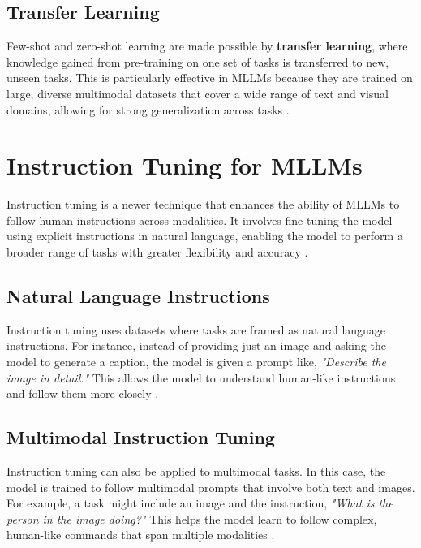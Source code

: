 \subsection{Transfer Learning}

Few-shot and zero-shot learning are made possible by \textbf{transfer learning}, where knowledge gained from pre-training on one set of tasks is transferred to new, unseen tasks. This is particularly effective in MLLMs because they are trained on large, diverse multimodal datasets that cover a wide range of text and visual domains, allowing for strong generalization across tasks \cite{TransferLearning2024}.

\section{Instruction Tuning for MLLMs}

Instruction tuning is a newer technique that enhances the ability of MLLMs to follow human instructions across modalities. It involves fine-tuning the model using explicit instructions in natural language, enabling the model to perform a broader range of tasks with greater flexibility and accuracy \cite{InstructionTuning2024}.

\subsection{Natural Language Instructions}

Instruction tuning uses datasets where tasks are framed as natural language instructions. For instance, instead of providing just an image and asking the model to generate a caption, the model is given a prompt like, \textit{"Describe the image in detail."} This allows the model to understand human-like instructions and follow them more closely \cite{NaturalLanguageInstructions2024}.

\subsection{Multimodal Instruction Tuning}

Instruction tuning can also be applied to multimodal tasks. In this case, the model is trained to follow multimodal prompts that involve both text and images. For example, a task might include an image and the instruction, \textit{"What is the person in the image doing?"} This helps the model learn to follow complex, human-like commands that span multiple modalities \cite{MultimodalInstructionTuning2024}.


